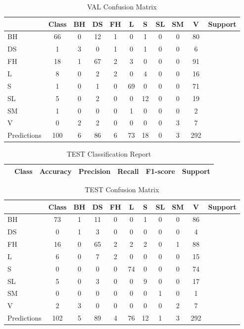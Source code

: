 \begin{table}[h]
\centering
\begin{tabular}{|l|c|c|c|c|c|c|c|c|c|} \hline
 & Class & BH & DS & FH & L & S & SL & SM & V & Support \\ \hline
BH & 66 & 0 & 12 & 1 & 0 & 1 & 0 & 0 & 80 \\ \hline
DS & 1 & 3 & 0 & 1 & 0 & 1 & 0 & 0 & 6 \\ \hline
FH & 18 & 1 & 67 & 2 & 3 & 0 & 0 & 0 & 91 \\ \hline
L & 8 & 0 & 2 & 2 & 0 & 4 & 0 & 0 & 16 \\ \hline
S & 1 & 0 & 1 & 0 & 69 & 0 & 0 & 0 & 71 \\ \hline
SL & 5 & 0 & 2 & 0 & 0 & 12 & 0 & 0 & 19 \\ \hline
SM & 1 & 0 & 0 & 0 & 1 & 0 & 0 & 0 & 2 \\ \hline
V & 0 & 2 & 2 & 0 & 0 & 0 & 0 & 3 & 7 \\ \hline
Predictions & 100 & 6 & 86 & 6 & 73 & 18 & 0 & 3 & 292 \\ \hline
\end{tabular}
\caption{VAL Confusion Matrix}
\label{tab:val_conf_matrix}
\end{table}

\begin{table}[h]
\centering
\begin{tabular}{|l|c|c|c|c|c|} \hline
 & Class & Accuracy & Precision & Recall & F1-score & Support \\ \hline
\end{tabular}
\caption{TEST Classification Report}
\label{tab:test_report}
\end{table}

\begin{table}[h]
\centering
\begin{tabular}{|l|c|c|c|c|c|c|c|c|c|} \hline
 & Class & BH & DS & FH & L & S & SL & SM & V & Support \\ \hline
BH & 73 & 1 & 11 & 0 & 0 & 1 & 0 & 0 & 86 \\ \hline
DS & 0 & 1 & 3 & 0 & 0 & 0 & 0 & 0 & 4 \\ \hline
FH & 16 & 0 & 65 & 2 & 2 & 2 & 0 & 1 & 88 \\ \hline
L & 6 & 0 & 7 & 2 & 0 & 0 & 0 & 0 & 15 \\ \hline
S & 0 & 0 & 0 & 0 & 74 & 0 & 0 & 0 & 74 \\ \hline
SL & 5 & 0 & 3 & 0 & 0 & 9 & 0 & 0 & 17 \\ \hline
SM & 0 & 0 & 0 & 0 & 0 & 0 & 1 & 0 & 1 \\ \hline
V & 2 & 3 & 0 & 0 & 0 & 0 & 0 & 2 & 7 \\ \hline
Predictions & 102 & 5 & 89 & 4 & 76 & 12 & 1 & 3 & 292 \\ \hline
\end{tabular}
\caption{TEST Confusion Matrix}
\label{tab:test_conf_matrix}
\end{table}

